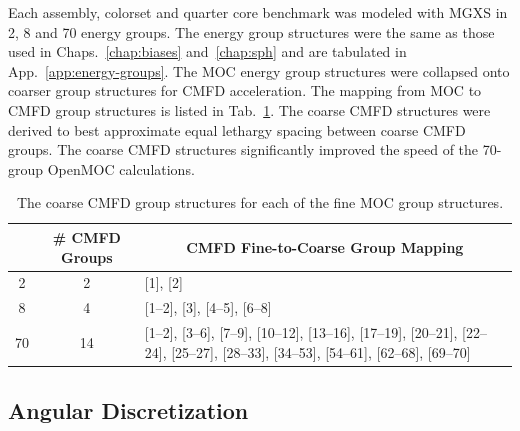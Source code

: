 Each assembly, colorset and quarter core benchmark was modeled with \ac{MGXS} in 2, 8 and 70 energy groups. The energy group structures were the same as those used in Chaps.~\ref{chap:biases} and~\ref{chap:sph} and are tabulated in App.~\ref{app:energy-groups}. The \ac{MOC} energy group structures were collapsed onto coarser group structures for \ac{CMFD} acceleration. The mapping from \ac{MOC} to \ac{CMFD} group structures is listed in Tab.~\ref{table:chap8-coarse-cmfd-groups}. The coarse \ac{CMFD} structures were derived to best approximate equal lethargy spacing between coarse \ac{CMFD} groups. The coarse \ac{CMFD} structures significantly improved the speed of the 70-group OpenMOC calculations.

\begin{table}[h!]
  \centering
  \caption[CMFD coarse energy group structures]{The coarse \ac{CMFD} group structures for each of the fine \ac{MOC} group structures.}
  \small
  \label{table:chap8-coarse-cmfd-groups}
  \vspace{6pt}
  \begin{tabular}{p{1.5cm} p{1.5cm} p{7.2cm}}
  \toprule
  \rowcolor{lightgray}
  \multicolumn{1}{c}{\cellcolor{lightgray} \textbf{\# \ac{MOC} Groups}} &
  \multicolumn{1}{c}{\cellcolor{lightgray} \textbf{\# \ac{CMFD} Groups}} &
  \multicolumn{1}{c}{\cellcolor{lightgray} \textbf{\ac{CMFD} Fine-to-Coarse Group Mapping}} \\
  \midrule
  \multicolumn{1}{c}{2} & \multicolumn{1}{c}{2} & [1], [2] \\
  \midrule
  \multicolumn{1}{c}{8} & \multicolumn{1}{c}{4} & [1--2], [3], [4--5], [6--8] \\
  \midrule
  \multicolumn{1}{c}{70} & \multicolumn{1}{c}{14} & [1--2], [3--6], [7--9], [10--12], [13--16], \hspace{0.6cm} [17--19], [20--21], [22--24], [25--27], [28--33], [34--53], [54--61], [62--68], [69--70] \\ 
  \bottomrule
\end{tabular}
\end{table}

\subsection{Angular Discretization}
\label{subsec:chap8-angular-discretizations}

